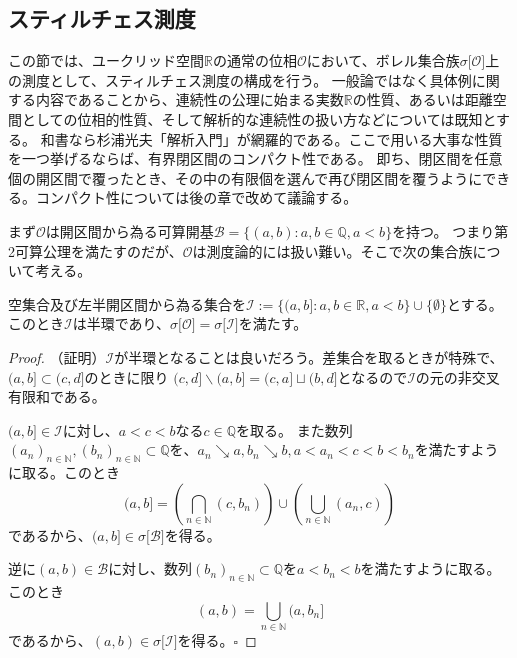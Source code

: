 \documentclass[../root.tex]{subfiles}
\begin{document}
\subsection{スティルチェス測度}
この節では、ユークリッド空間$ \mathbb{R} $の通常の位相$ \mathcal{O} $において、ボレル集合族$ \sigma\lbrack \mathcal{O} \rbrack $上の測度として、スティルチェス測度の構成を行う。
一般論ではなく具体例に関する内容であることから、連続性の公理に始まる実数$ \mathbb{R} $の性質、あるいは距離空間としての位相的性質、そして解析的な連続性の扱い方などについては既知とする。
和書なら杉浦光夫「解析入門」が網羅的である。ここで用いる大事な性質を一つ挙げるならば、有界閉区間のコンパクト性である。
即ち、閉区間を任意個の開区間で覆ったとき、その中の有限個を選んで再び閉区間を覆うようにできる。コンパクト性については後の章で改めて議論する。

まず$ \mathcal{O} $は開区間から為る可算開基$ \mathcal{B}=\lbrace ( a, b ) : a, b\in\mathbb{Q}, a\lt b \rbrace $を持つ。
つまり第2可算公理を満たすのだが、$ \mathcal{O} $は測度論的には扱い難い。そこで次の集合族について考える。

\begin{Prop}{}{}
空集合及び左半開区間から為る集合を$ \mathscr{I}:=\lbrace ( a, b \rbrack : a, b\in\mathbb{R}, a\lt b \rbrace\cup\lbrace \emptyset \rbrace $とする。
このとき$ \mathscr{I} $は半環であり、$ \sigma\lbrack \mathcal{O} \rbrack=\sigma\lbrack \mathscr{I} \rbrack $を満たす。
\end{Prop}

\begin{proof}
（証明）$ \mathscr{I} $が半環となることは良いだろう。差集合を取るときが特殊で、$ ( a, b \rbrack\subset( c, d \rbrack $のときに限り
$ ( c, d \rbrack\backslash( a, b \rbrack=( c, a \rbrack\sqcup( b, d \rbrack $となるので$ \mathscr{I} $の元の非交叉有限和である。

$ ( a, b \rbrack\in\mathscr{I} $に対し、$ a\lt c\lt b $なる$ c\in\mathbb{Q} $を取る。
また数列$ ( a_{n} )_{n\in\mathbb{N}}, ( b_{n} )_{n\in\mathbb{N}}\subset\mathbb{Q} $を、$ a_{n}\searrow a, b_{n}\searrow b, a\lt a_{n}\lt c\lt b\lt b_{n} $を満たすように取る。このとき
\[ ( a, b \rbrack=\left( \bigcap_{n\in\mathbb{N}}( c, b_{n} ) \right)\cup\left( \bigcup_{n\in\mathbb{N}}( a_{n}, c ) \right) \]
であるから、$ ( a, b \rbrack\in\sigma\lbrack \mathcal{B} \rbrack $を得る。

逆に$ ( a, b )\in\mathcal{B} $に対し、数列$ ( b_{n} )_{n\in\mathbb{N}}\subset\mathbb{Q} $を$ a\lt b_{n} \lt b $を満たすように取る。このとき
\[ ( a, b )=\bigcup_{n\in\mathbb{N}}( a, b_{n} \rbrack \]
であるから、$ ( a, b )\in\sigma\lbrack \mathscr{I} \rbrack $を得る。$ \square $
\end{proof}
\end{document}
